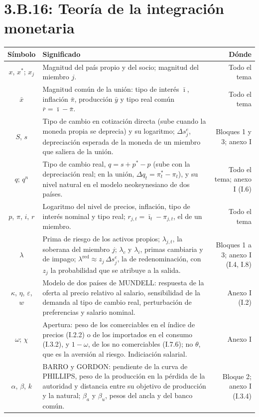 \documentclass[10pt,a4paper]{article}
\newcommand{\cabecera}{\toprule\textbf{Símbolo} & \textbf{Significado} & \textbf{Dónde}\\\midrule\endhead\bottomrule\endfoot}
\begin{document}
\section{3.B.16: Teoría de la integración monetaria}
\begin{longtable}{SMD}
\cabecera
$x$, $x^*$; $x_j$ & Magnitud del país propio y del socio; magnitud del miembro $j$. & Todo el tema\\
$\bar x$ & Magnitud común de la unión: tipo de interés $\bar\imath$, inflación $\bar\pi$, producción $\bar y$ y tipo real común $\bar r=\bar\imath-\bar\pi$. & Todo el tema\\
$S$, $s$ & Tipo de cambio en cotización directa (sube cuando la moneda propia se deprecia) y su logaritmo; $\Delta s^{e}_j$, depreciación esperada de la moneda de un miembro que saliera de la unión. & Bloques 1 y 3; anexo I\\
$q$; $q^n$ & Tipo de cambio real, $q=s+p^*-p$ (sube con la depreciación real; en la unión, $\Delta q_t=\pi^*_t-\pi_t$), y su nivel natural en el modelo neokeynesiano de dos países. & Todo el tema; anexo I (I.6)\\
$p$, $\pi$, $i$, $r$ & Logaritmo del nivel de precios, inflación, tipo de interés nominal y tipo real; $r_{j,t}=\bar\imath_t-\pi_{j,t}$, el de un miembro. & Todo el tema\\
$\lambda$ & Prima de riesgo de los activos propios; $\lambda_{j,t}$, la soberana del miembro $j$; $\lambda_c$ y $\lambda_i$, primas cambiaria y de impago; $\lambda^{\text{red}}\approx z_j\,\Delta s^{e}_j$, la de redenominación, con $z_j$ la probabilidad que se atribuye a la salida. & Bloques 1 a 3; anexo I (I.4, I.8)\\
$\kappa$, $\eta$, $\varepsilon$, $w$ & Modelo de dos países de MUNDELL: respuesta de la oferta al precio relativo al salario, sensibilidad de la demanda al tipo de cambio real, perturbación de preferencias y salario nominal. & Anexo I (I.2)\\
$\omega$; $\chi$ & Apertura: peso de los comerciables en el índice de precios (I.2.2) o de los importados en el consumo (I.3.2), y $1-\omega$, de los no comerciables (I.7.6); no $\theta$, que es la aversión al riesgo. Indiciación salarial. & Anexo I\\
$\alpha$, $\beta$, $k$ & BARRO y GORDON: pendiente de la curva de PHILLIPS, peso de la producción en la pérdida de la autoridad y distancia entre su objetivo de producción y la natural; $\beta_a$ y $\beta_u$, pesos del ancla y del banco común. & Bloque 2; anexo I (I.3.4)\\

\end{longtable}
\end{document}
